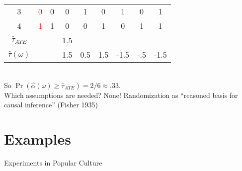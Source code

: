 \documentclass{beamer}
\numberwithin{equation}{section}
\begin{document}
\begin{frame}
\begin{overprint}
\begin{tabular}{ccccccccc}
\rowcolor{gray!10}         3 &          \textcolor{red}{0} &         0 &                    0 & 1 & 0 & 1 & 0&1 \\
\rowcolor{gray!10}         4 &          \textcolor{red}{1} &         1 &                    0 & 0 & 1 & 0 & 1&1\\
\hline
$\widehat{\tau}_{ATE}$    &                               &                       &   1.5   &  &   & & &\\
$\hat\tau(\omega)$    &                               &                       & 1.5  &  0.5       &1.5&-1.5&-.5&-1.5  \\
\end{tabular}\vspace{.5in}\\
So $\Pr(\hat\alpha(\omega) \geq \widehat{\tau}_{ATE})=2/6\approx.33$.\medskip\\ Which assumptions are needed? None! Randomization as ``reasoned basis for causal inference'' (Fisher 1935)

\end{overprint}
\end{frame}





\section{Examples}\label{examples}

\begin{frame}{Experiments in Popular Culture}

\centering
\end{frame}
\end{document}

